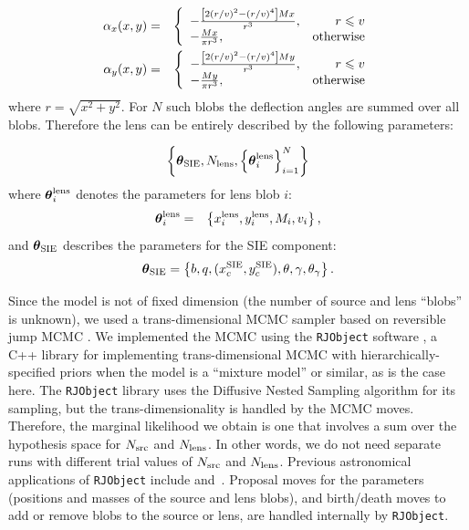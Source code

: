 \documentclass[useAMS,usenatbib]{mn2e}
\begin{document}

\begin{eqnarray}
\alpha_x(x, y) &=&
\left\{
\begin{array}{lr}
-\frac{\left[2(r/v)^2 - (r/v)^4\right]Mx}{r^3}, & r \leq v\\
-\frac{Mx}{\pi r^3}, & \textnormal{otherwise}
\end{array}
\right.\\
\alpha_y(x, y) &=&
\left\{
\begin{array}{lr}
-\frac{\left[2(r/v)^2 - (r/v)^4\right]My}{r^3}, & r \leq v\\
-\frac{My}{\pi r^3}, & \textnormal{otherwise}
\end{array}
\right.
\end{eqnarray}
where $r=\sqrt{x^2 + y^2}$. For $N$ such blobs the deflection angles are
summed over all blobs. Therefore the lens can be entirely described by
the following parameters:

\begin{eqnarray}
\left\{
\boldsymbol{\theta}_{\rm SIE},
N_{\rm lens}, \left\{\boldsymbol{\theta}^{\rm lens}_i\right\}_{i=1}^N
\right\}
\end{eqnarray}
where $\boldsymbol{\theta}^{\rm lens}_i$ denotes the parameters for lens blob $i$:
\begin{eqnarray}
\boldsymbol{\theta}^{\rm lens}_i &=& \left\{x_i^{\rm lens}, y_i^{\rm lens}, M_i, v_i
\right\},
\end{eqnarray}
and $\boldsymbol{\theta}_{\rm SIE}$ describes the parameters for the SIE
component:
\begin{eqnarray}
\boldsymbol{\theta}_{\rm SIE} = \left\{
b, q, (x_c^{\rm SIE}, y_c^{\rm SIE}), \theta, \gamma, \theta_\gamma
\right\}.
\end{eqnarray}

Since the model is not of fixed dimension (the number of source and lens
``blobs'' is unknown), we used a trans-dimensional MCMC sampler based on
reversible jump MCMC \citep{green}. We implemented the MCMC using the
{\tt RJObject} software \citep{rjobject}, a C++ library for implementing trans-dimensional MCMC with hierarchically-specified priors when the model is
a ``mixture model'' or similar, as is the case here.
The {\tt RJObject} library uses the
Diffusive Nested Sampling algorithm \citep{dnest} for its sampling, but the
trans-dimensionality is handled by the MCMC moves. Therefore, the marginal
likelihood we obtain is one that involves a sum over the hypothesis space
for $N_{\rm src}$ and $N_{\rm lens}$. In other words, we do not need
separate runs with different trial values of $N_{\rm src}$ and $N_{\rm lens}$.
Previous astronomical
applications of {\tt RJObject} include \citet{magnetron}
and~\citet{exoplanet}. Proposal moves for the parameters (positions and masses
of the source and lens blobs), and birth/death moves to add or remove blobs
to the source or lens, are handled internally by {\tt RJObject}.
\end{document}
